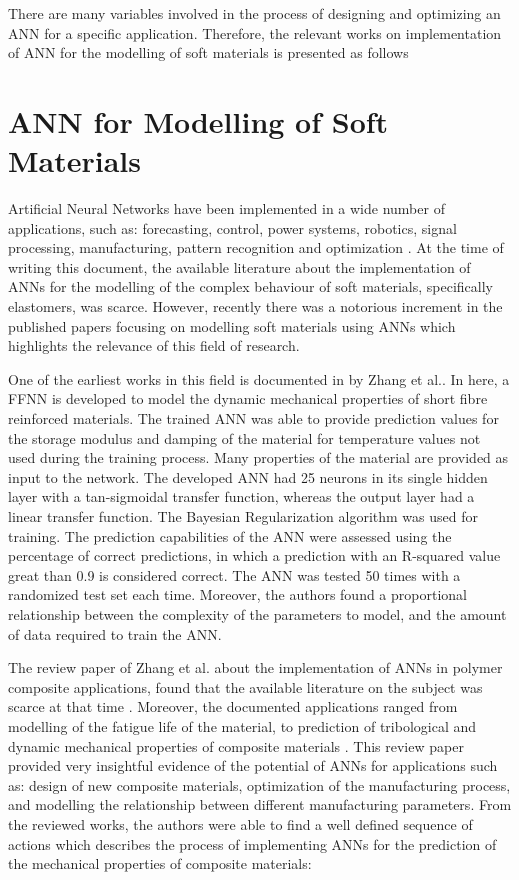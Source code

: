 There are many variables involved in the process of designing and optimizing an ANN for a specific application. Therefore, the relevant works on implementation of ANN for the modelling of soft materials is presented as follows

\section{ANN for Modelling of Soft Materials }

Artificial Neural Networks have been implemented in a wide number of applications, such as: forecasting, control, power systems, robotics, signal processing, manufacturing, pattern recognition and optimization \cite{khan2019fabrication}. At the time of writing this document, the available literature about the implementation of ANNs for the modelling of the complex behaviour of soft materials, specifically elastomers, was scarce. However, recently there was a notorious increment in the published papers focusing on modelling soft materials using ANNs which highlights the relevance of this field of research.

One of the earliest works in this field is documented in \cite{zhang2002dynamic} by Zhang et al.. In here, a FFNN is developed to model the dynamic mechanical properties of short fibre reinforced materials. The trained ANN was able to provide prediction values for the storage modulus and damping of the material for temperature values not used during the training process. Many properties of the material are provided as input to the network. The developed ANN had 25 neurons in its single hidden layer with a tan-sigmoidal transfer function, whereas the output layer had a linear transfer function. The Bayesian Regularization algorithm was used for training. The prediction capabilities of the ANN were assessed using the percentage of correct predictions, in which a prediction with an R-squared value great than 0.9 is considered correct. The ANN was tested 50 times with a randomized test set each time. Moreover, the authors found a proportional relationship between the complexity of the parameters to model, and the amount of data required to train the ANN. 

The review paper of Zhang et al. about the implementation of ANNs in polymer composite applications, found that the available literature on the subject was scarce at that time \cite{zhang2003artificial}. Moreover, the documented applications ranged from modelling of the fatigue life of the material, to prediction of tribological and dynamic mechanical properties of composite materials \cite{zhang2002prediction,zhang2002dynamic}. This review paper provided very insightful evidence of the potential of ANNs for applications such as: design of new composite materials, optimization of the manufacturing process, and modelling the relationship between different manufacturing parameters. From the reviewed works, the authors were able to find a well defined sequence of actions which describes the process of implementing ANNs for the prediction of the mechanical properties of composite materials:

